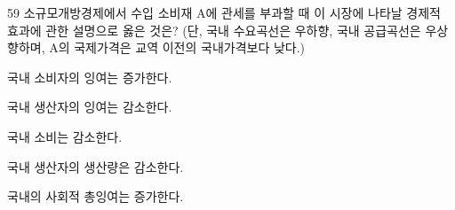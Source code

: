 \begin{question}{59}
소규모개방경제에서 수입 소비재 A에 관세를 부과할 때 이 시장에 나타날 경제적 효과에 관한 설명으로 옳은 것은? (단, 국내 수요곡선은 우하향, 국내 공급곡선은 우상향하며, A의 국제가격은 교역 이전의 국내가격보다 낮다.)
\begin{choices}
  \item 국내 소비자의 잉여는 증가한다.
  \item 국내 생산자의 잉여는 감소한다.
  \item 국내 소비는 감소한다.
  \item 국내 생산자의 생산량은 감소한다.
  \item 국내의 사회적 총잉여는 증가한다.
\end{choices}
\end{question}

